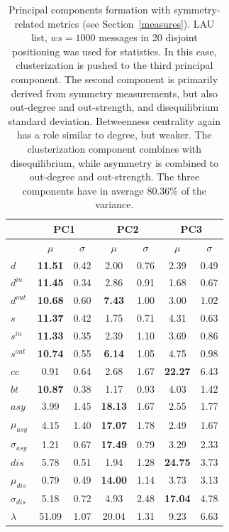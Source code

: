\documentclass[%
 aip,
 jmp,%
 amsmath,amssymb,
 reprint,%
]{revtex4-1}
\begin{document}
\begin{table}[!h]
  \centering
  \caption{Principal components formation with symmetry-related metrics (see Section~\ref{measures}). LAU list, $ws=1000$ messages in 20 disjoint positioning was used for statistics. In this case, clusterization is pushed to the third principal component. The second component is primarily derived from symmetry measurements, but also out-degree and out-strength, and disequilibrium standard deviation. Betweenness centrality again has a role similar to degree, but weaker. The clusterization component combines with disequilibrium, while asymmetry is combined to out-degree and out-strength. The three components have in average 80.36\% of the variance.}
  \begin{tabular}{|l|c|c| c|c| c|c|}\hline
 & \multicolumn{2}{c|}{PC1} & \multicolumn{2}{c|}{PC2} & \multicolumn{2}{c|}{PC3}  \\\hline
       & $\mu$ & $\sigma$ & $\mu$ & $\sigma$ & $\mu$ & $\sigma$  \\\hline
$d$            & {\bf 11.51} & 0.42 & 2.00  & 0.76 & 2.39  & 0.49 \\ 
$d^{in}$       & {\bf 11.45} & 0.34 & 2.86  & 0.91 & 1.68  & 0.67 \\
$d^{out}$      & {\bf 10.68} & 0.60 & {\bf 7.43}  & 1.00 & 3.00  & 1.02 \\
$s$            & {\bf 11.37} & 0.42 & 1.75  & 0.71 & 4.31  & 0.63 \\ 
$s^{in}$       & {\bf 11.33} & 0.35 & 2.39  & 1.10 & 3.69  & 0.86 \\ 
$s^{out}$      & {\bf 10.74} & 0.55 & {\bf 6.14}  & 1.05 & 4.75  & 0.98 \\ \hline
$cc$           & 0.91        & 0.64 & 2.68  & 1.67 & {\bf 22.27} & 6.43 \\ 
$bt$           & {\bf 10.87} & 0.38 & 1.17  & 0.93 & 4.03  & 1.42 \\ \hline
$asy$          & 3.99        & 1.45 & {\bf 18.13} & 1.67 & 2.55  & 1.77 \\
$\mu_{asy}$    & 4.15        & 1.40 & {\bf 17.07} & 1.78 & 2.49  & 1.67 \\
$\sigma_{asy}$ & 1.21        & 0.67 & {\bf 17.49} & 0.79 & 3.29  & 2.33 \\
$dis$          & 5.78        & 0.51 & 1.94  & 1.28 & {\bf 24.75} & 3.73 \\
$\mu_{dis}$    & 0.79        & 0.49 & {\bf 14.00} & 1.14 & 3.73  & 3.13 \\
$\sigma_{dis}$ & 5.18        & 0.72 & 4.93  & 2.48 & {\bf 17.04} & 4.78 \\ \hline
$\lambda$      & 51.09       & 1.07 & 20.04 & 1.31 & 9.23  & 6.63 \\ \hline
  \end{tabular}
  \label{compPCA2}
\end{table}
\end{document}
